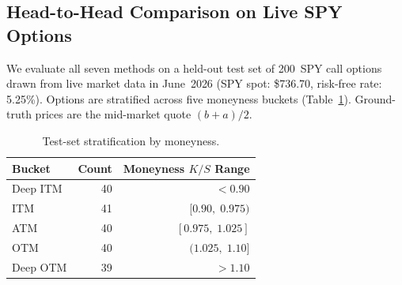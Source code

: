 \documentclass[12pt,a4paper]{article}
\begin{document}
\subsection{Head-to-Head Comparison on Live SPY Options}

We evaluate all seven methods on a held-out test set of 200~SPY call options
drawn from live market data in June~2026
(SPY spot: \$736.70, risk-free rate: 5.25\%).
Options are stratified across five moneyness buckets (Table~\ref{tab:buckets}).
Ground-truth prices are the mid-market quote $(b+a)/2$.

\begin{table}[H]
  \centering
  \caption{Test-set stratification by moneyness.}
  \label{tab:buckets}
  \renewcommand{\arraystretch}{1.2}
  \begin{tabular}{lrr}
    \toprule
    Bucket     & Count & Moneyness $K/S$ Range \\
    \midrule
    Deep ITM   & 40    & $< 0.90$ \\
    ITM        & 41    & $[0.90,\;0.975)$ \\
    ATM        & 40    & $[0.975,\;1.025]$ \\
    OTM        & 40    & $(1.025,\;1.10]$ \\
    Deep OTM   & 39    & $> 1.10$ \\
    \bottomrule
  \end{tabular}
\end{table}

\begin{table}[H]
  \centering
  \caption{Head-to-head comparison of all seven methods on $n=200$ live SPY
    European call options. Bold indicates the best (lowest error or highest
    speed) in each column.}
  \label{tab:main}
  \renewcommand{\arraystretch}{1.3}
\end{table}
\end{document}
